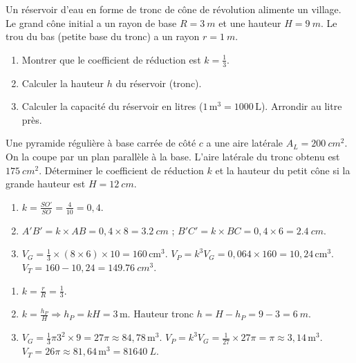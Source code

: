 \documentclass[11pt]{article}
\begin{document}
\begin{exercice}
Un réservoir d'eau en forme de tronc de cône de révolution alimente un village. Le grand cône initial a un rayon de base $R = \SI{3}{m}$ et une hauteur $H = \SI{9}{m}$. Le trou du bas (petite base du tronc) a un rayon $r = \SI{1}{m}$.
\begin{enumerate}
    \item Montrer que le coefficient de réduction est $k = \frac{1}{3}$.
    \item Calculer la hauteur $h$ du réservoir (tronc).
    \item Calculer la capacité du réservoir en litres ($1\,\text{m}^3 = 1000\,\text{L}$). Arrondir au litre près.
\end{enumerate}
\end{exercice}

\begin{exercice}
Une pyramide régulière à base carrée de côté $c$ a une aire latérale $A_L = \SI{200}{cm^2}$. On la coupe par un plan parallèle à la base. L'aire latérale du tronc obtenu est $\SI{175}{cm^2}$.
Déterminer le coefficient de réduction $k$ et la hauteur du petit cône si la grande hauteur est $H = \SI{12}{cm}$.
\end{exercice}

\begin{corrige}[Exercice 1]
\begin{enumerate}
    \item $k = \frac{SO'}{SO} = \frac{4}{10} = 0,4$.
    \item $A'B' = k \times AB = 0,4 \times 8 = \SI{3,2}{cm}$ ; $B'C' = k \times BC = 0,4 \times 6 = \SI{2,4}{cm}$.
    \item $V_G = \frac{1}{3} \times (8 \times 6) \times 10 = 160\,\text{cm}^3$. $V_P = k^3 V_G = 0,064 \times 160 = 10,24\,\text{cm}^3$. $V_T = 160 - 10,24 = \SI{149,76}{cm^3}$.
\end{enumerate}
\end{corrige}

\begin{corrige}[Exercice 2]
\begin{enumerate}
    \item $k = \frac{r}{R} = \frac{1}{3}$.
    \item $k = \frac{h_P}{H} \Rightarrow h_P = kH = 3\,\text{m}$. Hauteur tronc $h = H - h_P = 9 - 3 = \SI{6}{m}$.
    \item $V_G = \frac{1}{3}\pi 3^2 \times 9 = 27\pi \approx 84,78\,\text{m}^3$. $V_P = k^3 V_G = \frac{1}{27} \times 27\pi = \pi \approx 3,14\,\text{m}^3$. $V_T = 26\pi \approx 81,64\,\text{m}^3 = \SI{81640}{L}$.
\end{enumerate}
\end{corrige}
\end{document}
